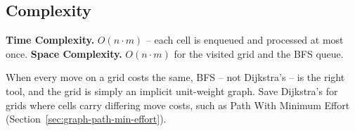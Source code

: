 \subsection*{Complexity}

\begin{complexitybox}
\textbf{Time Complexity.} $O(n\cdot m)$ -- each cell is enqueued and
processed at most once. \textbf{Space Complexity.} $O(n\cdot m)$ for the
visited grid and the BFS queue.
\end{complexitybox}

\begin{takeawaybox}
When every move on a grid costs the same, BFS -- not Dijkstra's -- is the
right tool, and the grid is simply an implicit unit-weight graph. Save
Dijkstra's for grids where cells carry differing move costs, such as
Path With Minimum Effort (Section~\ref{sec:graph-path-min-effort}).
\end{takeawaybox}
